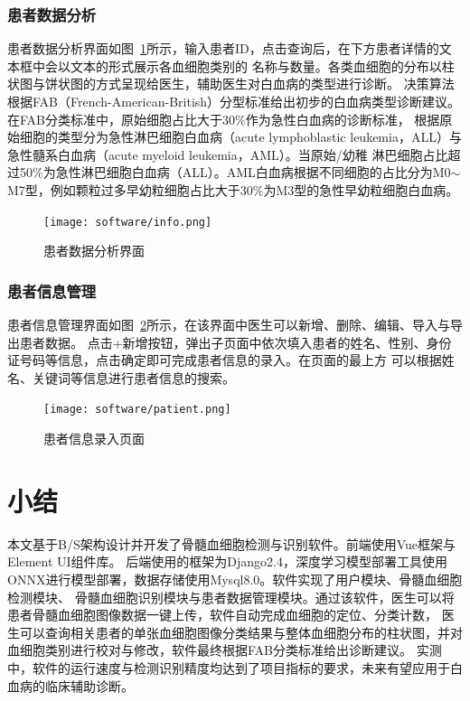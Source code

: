 \subsubsection{患者数据分析}
患者数据分析界面如图~\ref{fig:interface_info}所示，输入患者ID，点击查询后，在下方患者详情的文本框中会以文本的形式展示各血细胞类别的
名称与数量。各类血细胞的分布以柱状图与饼状图的方式呈现给医生，辅助医生对白血病的类型进行诊断。
决策算法根据FAB（French-American-British）分型标准给出初步的白血病类型诊断建议。在FAB分类标准中，原始细胞占比大于30\%作为急性白血病的诊断标准，
根据原始细胞的类型分为急性淋巴细胞白血病（acute lymphoblastic leukemia，ALL）与急性髓系白血病（acute myeloid leukemia，AML）。当原始/幼稚
淋巴细胞占比超过50\%为急性淋巴细胞白血病（ALL）。AML白血病根据不同细胞的占比分为M0$\sim$M7型，例如颗粒过多早幼粒细胞占比大于30\%为M3型的急性早幼粒细胞白血病。
\begin{figure}[htbp]                     
  \centering                      
  \texttt{[image: software/info.png]}                      
  \caption{患者数据分析界面}                      
  \label{fig:interface_info}       
\end{figure}
\subsubsection{患者信息管理}
患者信息管理界面如图~\ref{fig:interface_patient}所示，在该界面中医生可以新增、删除、编辑、导入与导出患者数据。
点击+新增按钮，弹出子页面中依次填入患者的姓名、性别、身份证号码等信息，点击确定即可完成患者信息的录入。在页面的最上方
可以根据姓名、关键词等信息进行患者信息的搜索。
\begin{figure}[htbp]                     
  \centering                      
  \texttt{[image: software/patient.png]}                      
  \caption{患者信息录入页面}                      
  \label{fig:interface_patient}       
\end{figure}
\section{小结}
本文基于B/S架构设计并开发了骨髓血细胞检测与识别软件。前端使用Vue框架与Element UI组件库。
后端使用的框架为Django2.4，深度学习模型部署工具使用ONNX进行模型部署，数据存储使用Mysql8.0。软件实现了用户模块、骨髓血细胞检测模块、
骨髓血细胞识别模块与患者数据管理模块。通过该软件，医生可以将患者骨髓血细胞图像数据一键上传，软件自动完成血细胞的定位、分类计数，
医生可以查询相关患者的单张血细胞图像分类结果与整体血细胞分布的柱状图，并对血细胞类别进行校对与修改，软件最终根据FAB分类标准给出诊断建议。
实测中，软件的运行速度与检测识别精度均达到了项目指标的要求，未来有望应用于白血病的临床辅助诊断。
